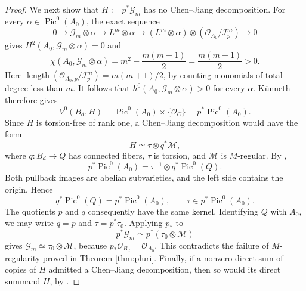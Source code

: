 \documentclass[11pt,letterpaper]{article}
\theoremstyle{paper}
\newcommand{\OO}{\mathcal O}
\newcommand{\GG}{\mathcal G}
\newcommand{\II}{\mathcal I}
\DeclareMathOperator{\Pic}{Pic}
\DeclareMathOperator{\length}{length}
\begin{document}
\begin{proof}
We next show that $H:=p^*\GG_m$ has no Chen--Jiang decomposition. For every $\alpha\in\Pic^0(A_0)$, the exact sequence
\[
0\longrightarrow\GG_m\otimes\alpha\longrightarrow L^m\otimes\alpha
\longrightarrow(L^m\otimes\alpha)\otimes(\OO_{A_0}/\II_p^m)\longrightarrow0
\]
gives $H^2(A_0,\GG_m\otimes\alpha)=0$ and
\[
\chi(A_0,\GG_m\otimes\alpha)
=m^2-\frac{m(m+1)}2=\frac{m(m-1)}2>0.
\]
Here $\length(\OO_{A_0,p}/\II_p^m)=m(m+1)/2$, by counting monomials of total degree less than $m$. It follows that $h^0(A_0,\GG_m\otimes\alpha)>0$ for every $\alpha$. K\"unneth therefore gives
\[
V^0(B_d,H)=\Pic^0(A_0)\times\{\OO_C\}=p^*\Pic^0(A_0).
\]
Since $H$ is torsion-free of rank one, a Chen--Jiang decomposition would have the form
\[
H\simeq\tau\otimes q^*\mathcal M,
\]
where $q:B_d\to Q$ has connected fibers, $\tau$ is torsion, and $\mathcal M$ is $M$-regular. By \cite[Lemma 3.3]{LPS},
\[
p^*\Pic^0(A_0)=\tau^{-1}\otimes q^*\Pic^0(Q).
\]
Both pullback images are abelian subvarieties, and the left side contains the origin. Hence
\[
q^*\Pic^0(Q)=p^*\Pic^0(A_0),\qquad \tau\in p^*\Pic^0(A_0).
\]
The quotients $p$ and $q$ consequently have the same kernel. Identifying $Q$ with $A_0$, we may write $q=p$ and $\tau=p^*\tau_0$. Applying $p_*$ to
\[
p^*\GG_m\simeq p^*(\tau_0\otimes\mathcal M)
\]
gives $\GG_m\simeq\tau_0\otimes\mathcal M$, because $p_*\OO_{B_d}=\OO_{A_0}$. This contradicts the failure of $M$-regularity proved in Theorem \ref{thm:pluri}. Finally, if a nonzero direct sum of copies of $H$ admitted a Chen--Jiang decomposition, then so would its direct summand $H$, by \cite[Proposition 3.6]{LPS}.
\end{proof}
\end{document}
